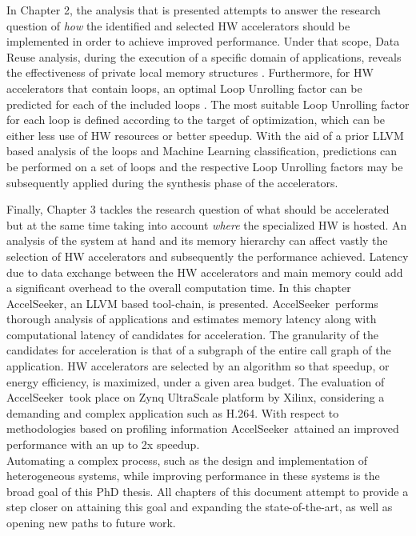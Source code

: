\documentclass[]{usiinfthesis}
\newcommand{\aseeker}{{AccelSeeker}}
\newcommand{\htsf}{{H.264}}
\newcommand{\SoTA}{{state-of-the-art}}
\begin{document}
In Chapter 2, the 
analysis that is presented attempts to answer the research question of {\em how} the identified and 
selected HW accelerators should be implemented in order to achieve improved performance. 
Under that scope, Data Reuse analysis, during the execution of a specific domain of applications, 
reveals the effectiveness of private local memory structures \cite{ZacharopoulosJan17}. 
Furthermore, for HW accelerators that contain loops, an optimal
Loop Unrolling factor can be predicted for each of the included loops \cite{ZacharopoulosJul18}. 
The most suitable Loop Unrolling factor
for each loop is defined according to the target of optimization, which can be either less use of HW
 resources or better speedup. With the aid of a prior LLVM based analysis 
 of the loops and Machine Learning classification, predictions can be performed on a set of loops and the respective 
Loop Unrolling factors may be subsequently applied during the synthesis phase of the accelerators. \par

Finally, Chapter 3 tackles the research question of what should be accelerated but at the same time
taking into account {\em where} the specialized HW is hosted.
An analysis of the system at hand and its memory hierarchy can affect vastly the selection
of HW accelerators and subsequently the performance achieved. Latency due to data exchange
between the HW accelerators and main memory could add a significant overhead to the overall 
computation time. In this chapter \aseeker, an LLVM based tool-chain, is presented. \aseeker\ 
performs thorough analysis of applications
and estimates memory latency along with computational latency of candidates for acceleration. The 
granularity of the candidates for acceleration is that of a subgraph of the entire call graph of 
the application. 
HW accelerators are selected by an algorithm so that speedup, or energy efficiency, is maximized, 
under a given area budget. The evaluation 
of \aseeker\ took place on Zynq UltraScale platform by Xilinx, considering a demanding and complex 
application such as \htsf. With respect to methodologies based on profiling information \aseeker\ 
attained an improved performance with an up to 2x speedup.\\
Automating a complex process, such as the design and implementation of heterogeneous systems, while
improving performance in these systems is the broad goal of this PhD thesis. All chapters of this document 
attempt to provide a step closer on attaining this goal and expanding the \SoTA, as well as opening 
new paths to future work.
\end{document}
